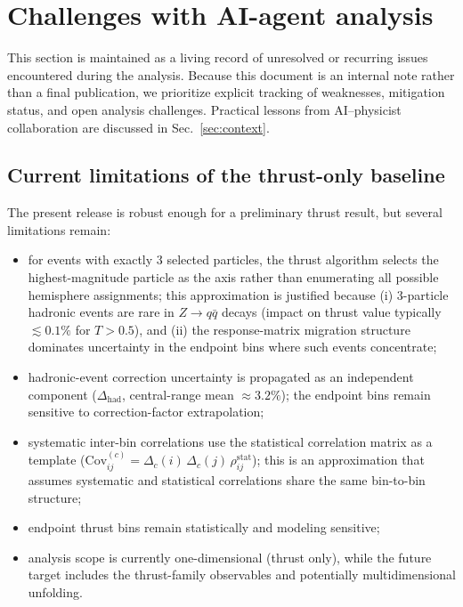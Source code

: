 \section{Challenges with AI-agent analysis}
\label{sec:challenges}

This section is maintained as a living record of unresolved or recurring issues encountered during the analysis. Because this document is an internal note rather than a final publication, we prioritize explicit tracking of weaknesses, mitigation status, and open analysis challenges. Practical lessons from AI--physicist collaboration are discussed in Sec.~\ref{sec:context}.

\subsection{Current limitations of the thrust-only baseline}

The present release is robust enough for a preliminary thrust result, but several limitations remain:
\begin{itemize}
\item for events with exactly 3 selected particles, the thrust algorithm selects the highest-magnitude particle as the axis rather than enumerating all possible hemisphere assignments; this approximation is justified because (i) 3-particle hadronic events are rare in $Z \to q\bar{q}$ decays (impact on thrust value typically $\lesssim 0.1\%$ for $T > 0.5$), and (ii) the response-matrix migration structure dominates uncertainty in the endpoint bins where such events concentrate;
\item hadronic-event correction uncertainty is propagated as an independent component ($\Delta_{\mathrm{had}}$, central-range mean $\approx 3.2\%$); the endpoint bins remain sensitive to correction-factor extrapolation;
\item systematic inter-bin correlations use the statistical correlation matrix as a template ($\mathrm{Cov}^{(c)}_{ij} = \Delta_c(i)\,\Delta_c(j)\,\rho^{\mathrm{stat}}_{ij}$); this is an approximation that assumes systematic and statistical correlations share the same bin-to-bin structure;
\item endpoint thrust bins remain statistically and modeling sensitive;
\item analysis scope is currently one-dimensional (thrust only), while the future target includes the thrust-family observables and potentially multidimensional unfolding.
\end{itemize}

